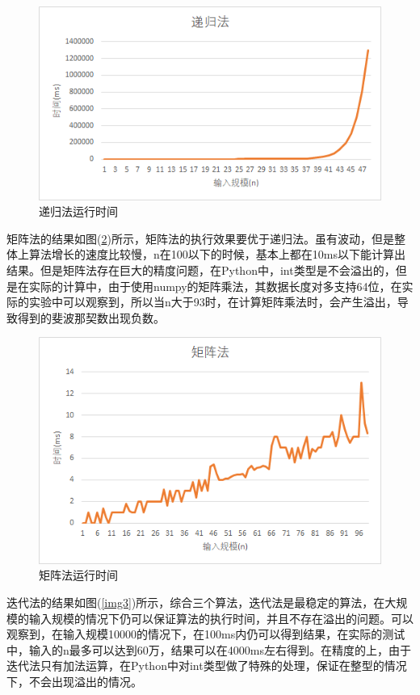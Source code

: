 \documentclass[UTF8]{ctexart}
\begin{document}
\begin{figure}[H]
    \centering
    \includegraphics[width=1\textwidth]{img/1.png}
    \caption{递归法运行时间}
    \label{img1}
\end{figure}

矩阵法的结果如图(\ref{img2})所示，矩阵法的执行效果要优于递归法。虽有波动，但是整体上算法增长的速度比较慢，n在100以下的时候，基本上都在10ms以下能计算出结果。但是矩阵法存在巨大的精度问题，在Python中，int类型是不会溢出的，但是在实际的计算中，由于使用numpy的矩阵乘法，其数据长度对多支持64位，在实际的实验中可以观察到，所以当n大于93时，在计算矩阵乘法时，会产生溢出，导致得到的斐波那契数出现负数。

\begin{figure}[H]
    \centering
    \includegraphics[width=1\textwidth]{img/2.png}
    \caption{矩阵法运行时间}
    \label{img2}
\end{figure}

迭代法的结果如图(\ref{img3})所示，综合三个算法，迭代法是最稳定的算法，在大规模的输入规模的情况下仍可以保证算法的执行时间，并且不存在溢出的问题。可以观察到，在输入规模10000的情况下，在100ms内仍可以得到结果，在实际的测试中，输入的n最多可以达到60万，结果可以在4000ms左右得到。在精度的上，由于迭代法只有加法运算，在Python中对int类型做了特殊的处理，保证在整型的情况下，不会出现溢出的情况。
\end{document}
